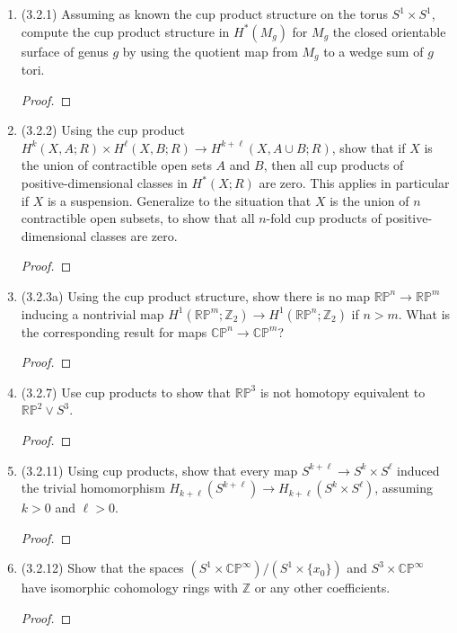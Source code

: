 \documentclass[11pt]{article}
\begin{document}
\begin{enumerate}
    \item (3.2.1) Assuming as known the cup product structure on the torus $S^1\times S^1$, compute the cup product structure in $H^\ast(M_g)$ for $M_g$ the closed orientable surface of genus $g$ by using the quotient map from $M_g$ to a wedge sum of $g$ tori. \begin{proof}
        
    \end{proof}
    \item (3.2.2) Using the cup product $H^k(X,A;R)\times H^\ell(X,B;R)\to H^{k+\ell}(X,A\cup B;R)$, show that if $X$ is the union of contractible open sets $A$ and $B$, then all cup products of positive-dimensional classes in $H^\ast(X;R)$ are zero. This applies in particular if $X$ is a suspension. Generalize to the situation that $X$ is the union of $n$ contractible open subsets, to show that all $n$-fold cup products of positive-dimensional classes are zero. \begin{proof}
        
    \end{proof}
    \item (3.2.3a) Using the cup product structure, show there is no map $\mathbb{RP}^n\to \mathbb{RP}^m$ inducing a nontrivial map $H^1(\mathbb{RP}^m;\mathbb{Z}_2)\to H^1(\mathbb{RP}^n;\mathbb{Z}_2)$ if $n>m$. What is the corresponding result for maps $\mathbb{CP}^n\to\mathbb{CP}^m$? \begin{proof}
        
    \end{proof}
    \item (3.2.7) Use cup products to show that $\mathbb{RP}^3$ is not homotopy equivalent to $\mathbb{RP}^2\vee S^3$. \begin{proof}
        
    \end{proof}
    \item (3.2.11) Using cup products, show that every map $S^{k+\ell}\to S^k\times S^\ell$ induced the trivial homomorphism $H_{k+\ell}(S^{k+\ell})\to H_{k+\ell}(S^k\times S^\ell)$, assuming $k>0$ and $\ell>0$. \begin{proof}
        
    \end{proof}
    \item (3.2.12) Show that the spaces $(S^1\times \mathbb{CP}^\infty)/(S^1\times \{x_0\})$ and $S^3\times \mathbb{CP}^\infty$ have isomorphic cohomology rings with $\mathbb{Z}$ or any other coefficients. \begin{proof}
        
    \end{proof}
\end{enumerate}
\end{document}
